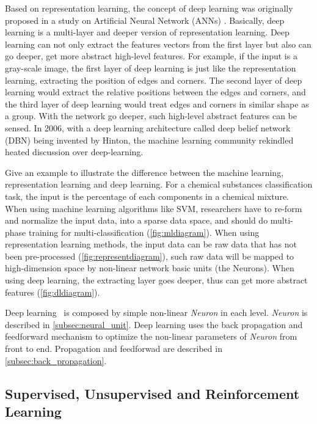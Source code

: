 \begin{spacing}{1.5}
Based on representation learning, the concept of deep learning was originally proposed in a study on Artificial Neural Network (ANNs) \cite{hinton2006reducing}. Basically, deep learning is a multi-layer and deeper version of representation learning. Deep learning can not only extract the features vectors from the first layer but also can go deeper, get more abstract high-level features. For example, if the input is a gray-scale image, the first layer of deep learning is just like the representation learning, extracting the position of edges and corners. The second layer of deep learning would extract the relative positions between the edges and corners, and the third layer of deep learning would treat edges and corners in similar shape as a group. With the network go deeper, such high-level abstract features can be sensed. In 2006, with a deep learning architecture called deep belief network (DBN) \cite{hinton2006fast} being invented by Hinton, the machine learning community rekindled heated discussion over deep-learning.

Give an example to illustrate the difference between the machine learning, representation learning and deep learning. For a chemical substances classification task, the input is the percentage of each components in a chemical mixture. When using machine learning algorithms like SVM, researchers have to re-form and normalize the input data, into a sparse data space, and should do multi-phase training for multi-classification (\autoref{fig:mldiagram}). When using representation learning methods, the input data can be raw data that has not been pre-processed (\autoref{fig:representdiagram}), such raw data will be mapped to high-dimension space by non-linear network basic units (the Neurons). When using deep learning, the extracting layer goes deeper, thus can get more abstract features (\autoref{fig:dldiagram}).

Deep learning~\cite{lecun2015deep} is composed by simple non-linear \textit{Neuron} in each level. \textit{Neuron} is described in \autoref{subsec:neural_unit}. Deep learning uses the back propagation and feedforward mechanism to optimize the non-linear parameters of \textit{Neuron} from front to end. Propagation and feedforwad are described in \autoref{subsec:back_propagation}.


\subsection{Supervised, Unsupervised and Reinforcement Learning}


\end{spacing}
